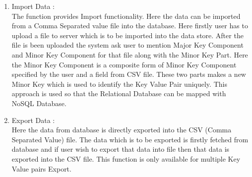 \begin{enumerate}
  \item Import Data : \\
\hspace*{0.7in} The function provides Import functionality. Here the data can be imported from a Comma Separated value file into the database. Here firstly user has to upload a file to server which is to be imported into the data store. After the file is been uploaded the system ask user to mention Major Key Component and Minor Key Component for that file along with the Minor Key Part. Here the Minor Key Component is a composite form of Minor Key Component specified by the user and a field from CSV file. These two parts makes a new Minor Key which is used to identify the Key Value Pair uniquely. This approach is used so that the Relational Database can be mapped with NoSQL Database.

  \item Export Data : \\
\hspace*{0.7in} Here the data from database is directly exported into the CSV (Comma Separated Value) file. The data which is to be exported is firstly fetched from database and if user wish to export that data into file then that data is exported into the CSV file. This function is only available for multiple Key Value pairs Export.
\end{enumerate}

